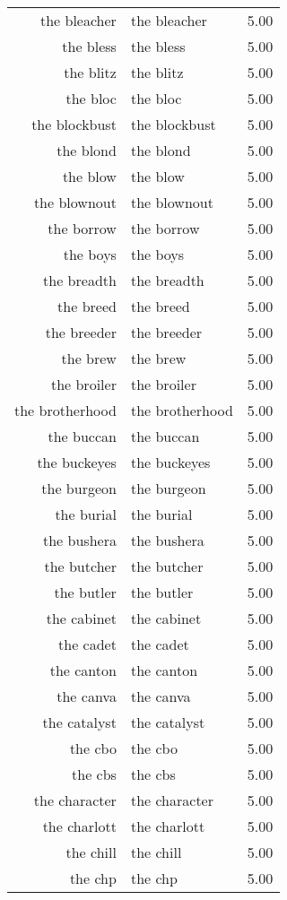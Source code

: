 \begin{table}[ht]
\begin{tabular}{rlr}
  the bleacher & the bleacher & 5.00 \\ 
  the bless & the bless & 5.00 \\ 
  the blitz & the blitz & 5.00 \\ 
  the bloc & the bloc & 5.00 \\ 
  the blockbust & the blockbust & 5.00 \\ 
  the blond & the blond & 5.00 \\ 
  the blow & the blow & 5.00 \\ 
  the blownout & the blownout & 5.00 \\ 
  the borrow & the borrow & 5.00 \\ 
  the boys & the boys & 5.00 \\ 
  the breadth & the breadth & 5.00 \\ 
  the breed & the breed & 5.00 \\ 
  the breeder & the breeder & 5.00 \\ 
  the brew & the brew & 5.00 \\ 
  the broiler & the broiler & 5.00 \\ 
  the brotherhood & the brotherhood & 5.00 \\ 
  the buccan & the buccan & 5.00 \\ 
  the buckeyes & the buckeyes & 5.00 \\ 
  the burgeon & the burgeon & 5.00 \\ 
  the burial & the burial & 5.00 \\ 
  the bushera & the bushera & 5.00 \\ 
  the butcher & the butcher & 5.00 \\ 
  the butler & the butler & 5.00 \\ 
  the cabinet & the cabinet & 5.00 \\ 
  the cadet & the cadet & 5.00 \\ 
  the canton & the canton & 5.00 \\ 
  the canva & the canva & 5.00 \\ 
  the catalyst & the catalyst & 5.00 \\ 
  the cbo & the cbo & 5.00 \\ 
  the cbs & the cbs & 5.00 \\ 
  the character & the character & 5.00 \\ 
  the charlott & the charlott & 5.00 \\ 
  the chill & the chill & 5.00 \\ 
  the chp & the chp & 5.00 \\ 

\end{tabular}
\end{table}
